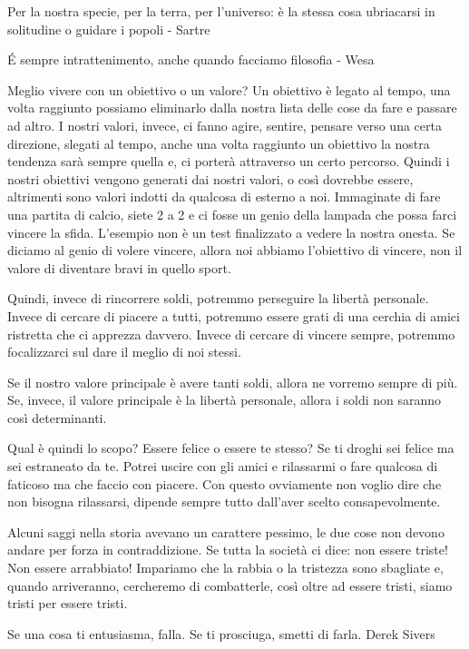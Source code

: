 \documentclass[12pt]{book} %
\begin{document}
\bigskip

Per la nostra specie, per la terra, per l'universo: è la stessa cosa ubriacarsi in solitudine o guidare i popoli - Sartre 

É sempre intrattenimento, anche quando facciamo filosofia - Wesa

\bigskip

Meglio vivere con un obiettivo o un valore?
Un obiettivo è legato al tempo, una volta raggiunto possiamo eliminarlo dalla nostra lista delle cose da fare e passare
ad altro. I nostri valori, invece, ci fanno agire, sentire, pensare verso una certa direzione, slegati al tempo, anche
una volta raggiunto un obiettivo la nostra tendenza sarà sempre quella e, ci porterà attraverso un certo percorso.
Quindi i nostri obiettivi vengono generati dai nostri valori, o così dovrebbe essere, altrimenti sono valori indotti da
qualcosa di esterno a noi. Immaginate di fare una partita di calcio, siete 2 a 2 e ci fosse un genio della lampada che
possa farci vincere la sfida. L'esempio non è un test finalizzato a vedere la nostra onesta. Se diciamo al genio di
volere vincere, allora noi abbiamo l'obiettivo di vincere, non il valore di diventare bravi in quello sport.

Quindi, invece di rincorrere soldi, potremmo perseguire la libertà personale. Invece di cercare di piacere a tutti,
potremmo essere grati di una cerchia di amici ristretta che ci apprezza davvero. 
Invece di cercare di vincere sempre, potremmo focalizzarci sul dare il meglio di noi stessi. 

Se il nostro valore principale è avere tanti soldi, allora ne vorremo sempre di più. Se, invece, il valore principale è la libertà
personale, allora i soldi non saranno così determinanti. 

Qual è quindi lo scopo? Essere felice o essere te stesso? Se ti droghi sei felice ma sei estraneato da te. Potrei uscire con gli
amici e rilassarmi o fare qualcosa di faticoso ma che faccio con piacere. Con questo ovviamente non voglio dire che non
bisogna rilassarsi, dipende sempre tutto dall'aver scelto consapevolmente.

Alcuni saggi nella storia avevano un carattere pessimo, le due cose non devono andare per forza in contraddizione. 
Se tutta la società ci dice: non essere triste! Non essere arrabbiato! Impariamo che la rabbia o la tristezza sono sbagliate e, quando arriveranno, cercheremo di combatterle, così oltre ad essere tristi, siamo tristi per essere tristi.

Se una cosa ti entusiasma, falla. Se ti prosciuga, smetti di farla.
Derek Sivers 
\end{document}
